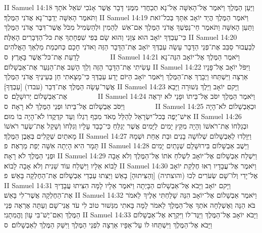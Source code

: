 II Samuel 14:18	וַיַּעַן הַמֶּלֶךְ וַיֹּאמֶר אֶל־הָאִשָּׁה אַל־נָא תְכַחֲדִי מִמֶּנִּי דָּבָר אֲשֶׁר אָנֹכִי שֹׁאֵל אֹתָךְ וַתֹּאמֶר הָאִשָּׁה יְדַבֶּר־נָא אֲדֹנִי הַמֶּלֶךְ׃
II Samuel 14:19	וַיֹּאמֶר הַמֶּלֶךְ הֲיַד יוֹאָב אִתָּךְ בְּכל־זֹאת וַתַּעַן הָאִשָּׁה וַתֹּאמֶר חֵי־נַפְשְׁךָ אֲדֹנִי הַמֶּלֶךְ אִם־אִשׁ  לְהֵמִין וּלְהַשְׂמִיל מִכֹּל אֲשֶׁר־דִּבֶּר אֲדֹנִי הַמֶּלֶךְ כִּי־עַבְדְּךָ יוֹאָב הוּא צִוָּנִי וְהוּא שָׂם בְּפִי שִׁפְחָתְךָ אֵת כּל־הַדְּבָרִים הָאֵלֶּה׃
II Samuel 14:20	לְבַעֲבוּר סַבֵּב אֶת־פְּנֵי הַדָּבָר עָשָׂה עַבְדְּךָ יוֹאָב אֶת־הַדָּבָר הַזֶּה וַאדֹנִי חָכָם כְּחכְמַת מַלְאַךְ הָאֱלֹהִים לָדַעַת אֶת־כּל־אֲשֶׁר בָּאָרֶץ׃ {ס}        
II Samuel 14:21	וַיֹּאמֶר הַמֶּלֶךְ אֶל־יוֹאָב הִנֵּה־נָא עָשִׂיתִי אֶת־הַדָּבָר הַזֶּה וְלֵךְ הָשֵׁב אֶת־הַנַּעַר אֶת־אַבְשָׁלוֹם׃
II Samuel 14:22	וַיִּפֹּל יוֹאָב אֶל־פָּנָיו אַרְצָה וַיִּשְׁתַּחוּ וַיְבָרֶךְ אֶת־הַמֶּלֶךְ וַיֹּאמֶר יוֹאָב הַיּוֹם יָדַע עַבְדְּךָ כִּי־מָצָאתִי חֵן בְּעֵינֶיךָ אֲדֹנִי הַמֶּלֶךְ אֲשֶׁר־עָשָׂה הַמֶּלֶךְ אֶת־דְּבַר (עבדו) [עַבְדֶּךָ]׃
II Samuel 14:23	וַיָּקם יוֹאָב וַיֵּלֶךְ גְּשׁוּרָה וַיָּבֵא אֶת־אַבְשָׁלוֹם יְרוּשָׁלָ͏ִם׃ {ס}        
II Samuel 14:24	וַיֹּאמֶר הַמֶּלֶךְ יִסֹּב אֶל־בֵּיתוֹ וּפָנַי לֹא יִרְאֶה וַיִּסֹּב אַבְשָׁלוֹם אֶל־בֵּיתוֹ וּפְנֵי הַמֶּלֶךְ לֹא רָאָה׃ {ס}        
II Samuel 14:25	וּכְאַבְשָׁלוֹם לֹא־הָיָה אִישׁ־יָפֶה בְּכל־יִשְׂרָאֵל לְהַלֵּל מְאֹד מִכַּף רַגְלוֹ וְעַד קדְקֳדוֹ לֹא־הָיָה בוֹ מוּם׃
II Samuel 14:26	וּבְגַלְּחוֹ אֶת־רֹאשׁוֹ וְהָיָה מִקֵּץ יָמִים  לַיָּמִים אֲשֶׁר יְגַלֵּחַ כִּי־כָבֵד עָלָיו וְגִלְּחוֹ וְשָׁקַל אֶת־שְׂעַר רֹאשׁוֹ מָאתַיִם שְׁקָלִים בְּאֶבֶן הַמֶּלֶךְ׃
II Samuel 14:27	וַיִּוָּלְדוּ לְאַבְשָׁלוֹם שְׁלוֹשָׁה בָנִים וּבַת אַחַת וּשְׁמָהּ תָּמָר הִיא הָיְתָה אִשָּׁה יְפַת מַרְאֶה׃ {פ}
II Samuel 14:28	וַיֵּשֶׁב אַבְשָׁלוֹם בִּירוּשָׁלַ͏ִם שְׁנָתַיִם יָמִים וּפְנֵי הַמֶּלֶךְ לֹא רָאָה׃
II Samuel 14:29	וַיִּשְׁלַח אַבְשָׁלוֹם אֶל־יוֹאָב לִשְׁלֹחַ אֹתוֹ אֶל־הַמֶּלֶךְ וְלֹא אָבָה לָבוֹא אֵלָיו וַיִּשְׁלַח עוֹד שֵׁנִית וְלֹא אָבָה לָבוֹא׃
II Samuel 14:30	וַיֹּאמֶר אֶל־עֲבָדָיו רְאוּ חֶלְקַת יוֹאָב אֶל־יָדִי וְלוֹ־שָׁם שְׂעֹרִים לְכוּ (והוצתיה) [וְהַצִּיתוּהָ] בָאֵשׁ וַיַּצִּתוּ עַבְדֵי אַבְשָׁלוֹם אֶת־הַחֶלְקָה בָּאֵשׁ׃ {פ}
II Samuel 14:31	וַיָּקם יוֹאָב וַיָּבֹא אֶל־אַבְשָׁלוֹם הַבָּיְתָה וַיֹּאמֶר אֵלָיו לָמָּה הִצִּיתוּ עֲבָדֶיךָ אֶת־הַחֶלְקָה אֲשֶׁר־לִי בָּאֵשׁ׃
II Samuel 14:32	וַיֹּאמֶר אַבְשָׁלוֹם אֶל־יוֹאָב הִנֵּה שָׁלַחְתִּי אֵלֶיךָ  לֵאמֹר בֹּא הֵנָּה וְאֶשְׁלְחָה אֹתְךָ אֶל־הַמֶּלֶךְ לֵאמֹר לָמָּה בָּאתִי מִגְּשׁוּר טוֹב לִי עֹד אֲנִי־שָׁם וְעַתָּה אֶרְאֶה פְּנֵי הַמֶּלֶךְ וְאִם־יֶשׁ־בִּי עָוֺן וֶהֱמִתָנִי׃
II Samuel 14:33	וַיָּבֹא יוֹאָב אֶל־הַמֶּלֶךְ וַיַּגֶּד־לוֹ וַיִּקְרָא אֶל־אַבְשָׁלוֹם וַיָּבֹא אֶל־הַמֶּלֶךְ וַיִּשְׁתַּחוּ לוֹ עַל־אַפָּיו אַרְצָה לִפְנֵי הַמֶּלֶךְ וַיִּשַּׁק הַמֶּלֶךְ לְאַבְשָׁלוֹם׃ {ס}        

